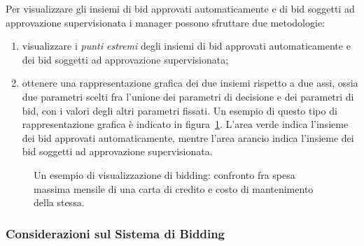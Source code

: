 Per visualizzare gli insiemi di bid approvati automaticamente e di bid soggetti ad approvazione supervisionata i manager possono sfruttare due metodologie:
\begin{enumerate}
	\item visualizzare i \emph{punti estremi} degli insiemi di bid approvati automaticamente e dei bid soggetti ad approvazione supervisionata;

	\item ottenere una rappresentazione grafica dei due insiemi rispetto a due assi, ossia due parametri scelti fra l'unione dei parametri di decisione e dei parametri di bid, con i valori degli altri parametri fissati.
	Un esempio di questo tipo di rappresentazione grafica è indicato in figura~\ref{fig:visualization-bidding}.
	L'area verde indica l'insieme dei bid approvati automaticamente, mentre l'area arancio indica l'insieme dei bid soggetti ad approvazione supervisionata.
\end{enumerate}

\begin{figure}
\centering
	\caption{Un esempio di visualizzazione di bidding: confronto fra spesa massima mensile di una carta di credito e costo di mantenimento della stessa.}
	\label{fig:visualization-bidding}
\end{figure}

\subsubsection{Considerazioni sul Sistema di Bidding}

